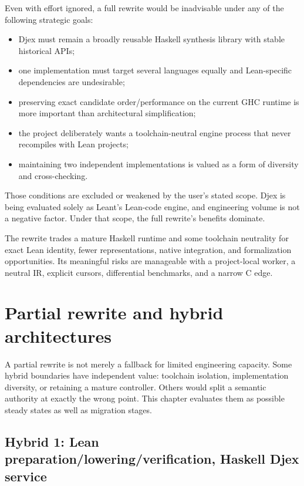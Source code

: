\documentclass[10pt,letterpaper,oneside]{report}
\begin{document}
Even with effort ignored, a full rewrite would be inadvisable under any of the following strategic goals:

\begin{itemize}
  \item Djex must remain a broadly reusable Haskell synthesis library with stable historical APIs;
  \item one implementation must target several languages equally and Lean-specific dependencies are undesirable;
  \item preserving exact candidate order/performance on the current GHC runtime is more important than architectural simplification;
  \item the project deliberately wants a toolchain-neutral engine process that never recompiles with Lean projects;
  \item maintaining two independent implementations is valued as a form of diversity and cross-checking.
\end{itemize}

Those conditions are excluded or weakened by the user's stated scope. Djex is being evaluated solely as Leant's Lean-code engine, and engineering volume is not a negative factor. Under that scope, the full rewrite's benefits dominate.

\begin{summarybox}
The rewrite trades a mature Haskell runtime and some toolchain neutrality for exact Lean identity, fewer representations, native integration, and formalization opportunities. Its meaningful risks are manageable with a project-local worker, a neutral IR, explicit cursors, differential benchmarks, and a narrow C edge.
\end{summarybox}

\chapter{Partial rewrite and hybrid architectures}\label{ch:hybrid}

A partial rewrite is not merely a fallback for limited engineering capacity. Some hybrid boundaries have independent value: toolchain isolation, implementation diversity, or retaining a mature controller. Others would split a semantic authority at exactly the wrong point. This chapter evaluates them as possible steady states as well as migration stages.

\section{Hybrid 1: Lean preparation/lowering/verification, Haskell Djex service}
\end{document}
